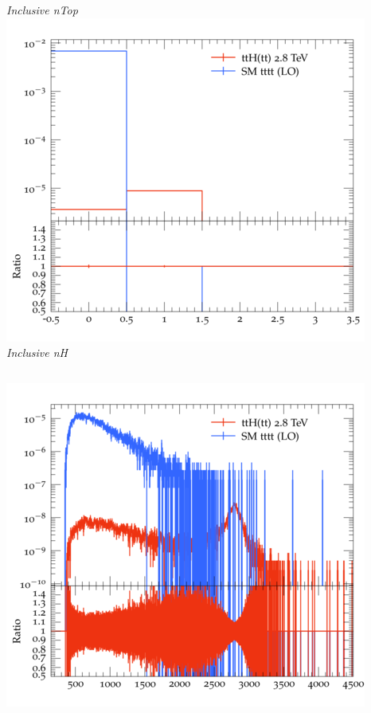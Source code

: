 \documentclass{beamer}
\begin{document}
\begin{frame}
\begin{columns}
\textit{\small Inclusive nTop}
\includegraphics[width=\textwidth]{../plots/ttH_2800/tttt_ttH/Inclusive_nH.png}\\
\textit{\small Inclusive nH}
\end{columns}
\begin{columns}
\includegraphics[width=\textwidth]{../plots/ttH_2800/tttt_ttH/Inclusive_InvM_ttbar12.png}\\

\end{columns}
\end{frame}
\end{document}
